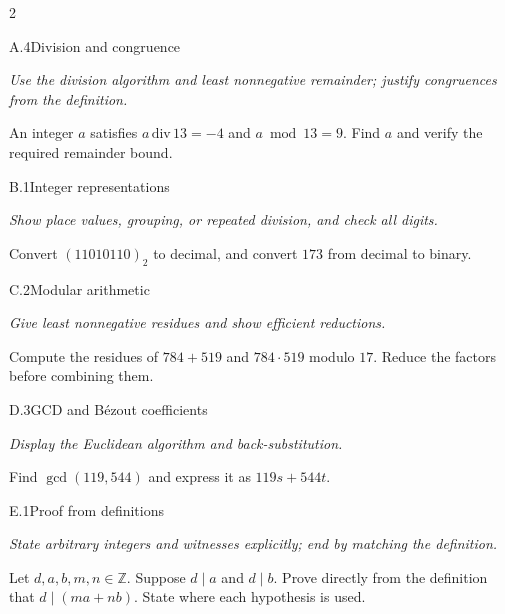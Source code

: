 \documentclass[9pt]{extarticle}
\begin{document}
\begin{multicols}{2}
\begin{CoreProblem}{A.4}{Division and congruence}
{\scriptsize\textit{Use the division algorithm and least nonnegative remainder; justify congruences from the definition.}\par}
An integer $a$ satisfies $a\,\mathrm{div}\,13=-4$ and $a\bmod13=9$.
Find $a$ and verify the required remainder bound.
\end{CoreProblem}
\begin{CoreProblem}{B.1}{Integer representations}
{\scriptsize\textit{Show place values, grouping, or repeated division, and check all digits.}\par}
Convert $(11010110)_2$ to decimal, and convert $173$ from decimal to binary.
\end{CoreProblem}
\begin{CoreProblem}{C.2}{Modular arithmetic}
{\scriptsize\textit{Give least nonnegative residues and show efficient reductions.}\par}
Compute the residues of $784+519$ and $784\cdot519$ modulo $17$. Reduce the
factors before combining them.
\end{CoreProblem}
\columnbreak
\begin{CoreProblem}{D.3}{GCD and B\'ezout coefficients}
{\scriptsize\textit{Display the Euclidean algorithm and back-substitution.}\par}
Find $\gcd(119,544)$ and express it as $119s+544t$.
\end{CoreProblem}
\begin{CoreProblem}{E.1}{Proof from definitions}
{\scriptsize\textit{State arbitrary integers and witnesses explicitly; end by matching the definition.}\par}
Let $d,a,b,m,n\in\mathbb Z$. Suppose $d\mid a$ and $d\mid b$. Prove directly
from the definition that $d\mid(ma+nb)$. State where each hypothesis is used.
\end{CoreProblem}
\end{multicols}
\CoreWorkArea
\FormBreak
{}
\end{document}
